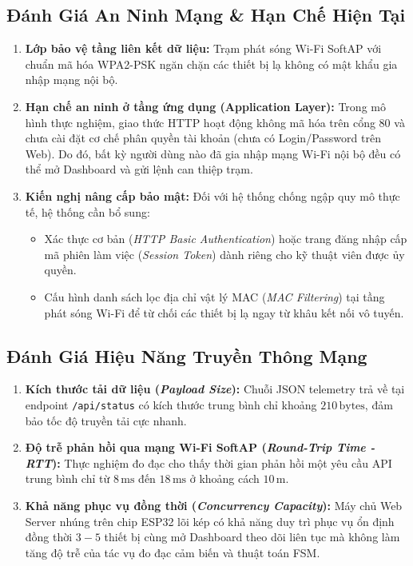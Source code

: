 \subsection{Đánh Giá An Ninh Mạng \& Hạn Chế Hiện Tại}
\begin{enumerate}
    \item \textbf{Lớp bảo vệ tầng liên kết dữ liệu:} Trạm phát sóng Wi-Fi SoftAP với chuẩn mã hóa WPA2-PSK ngăn chặn các thiết bị lạ không có mật khẩu gia nhập mạng nội bộ.
    \item \textbf{Hạn chế an ninh ở tầng ứng dụng (Application Layer):} Trong mô hình thực nghiệm, giao thức HTTP hoạt động không mã hóa trên cổng 80 và chưa cài đặt cơ chế phân quyền tài khoản (chưa có Login/Password trên Web). Do đó, bất kỳ người dùng nào đã gia nhập mạng Wi-Fi nội bộ đều có thể mở Dashboard và gửi lệnh can thiệp trạm.
    \item \textbf{Kiến nghị nâng cấp bảo mật:} Đối với hệ thống chống ngập quy mô thực tế, hệ thống cần bổ sung:
    \begin{itemize}
        \item Xác thực cơ bản (\textit{HTTP Basic Authentication}) hoặc trang đăng nhập cấp mã phiên làm việc (\textit{Session Token}) dành riêng cho kỹ thuật viên được ủy quyền.
        \item Cấu hình danh sách lọc địa chỉ vật lý MAC (\textit{MAC Filtering}) tại tầng phát sóng Wi-Fi để từ chối các thiết bị lạ ngay từ khâu kết nối vô tuyến.
    \end{itemize}
\end{enumerate}

\subsection{Đánh Giá Hiệu Năng Truyền Thông Mạng}
\label{sec:network_performance}
\begin{enumerate}
    \item \textbf{Kích thước tải dữ liệu (\textit{Payload Size}):} Chuỗi JSON telemetry trả về tại endpoint \texttt{/api/status} có kích thước trung bình chỉ khoảng $210\,\text{bytes}$, đảm bảo tốc độ truyền tải cực nhanh.
    \item \textbf{Độ trễ phản hồi qua mạng Wi-Fi SoftAP (\textit{Round-Trip Time - RTT}):} Thực nghiệm đo đạc cho thấy thời gian phản hồi một yêu cầu API trung bình chỉ từ $8\,\text{ms}$ đến $18\,\text{ms}$ ở khoảng cách $10\,\text{m}$.
    \item \textbf{Khả năng phục vụ đồng thời (\textit{Concurrency Capacity}):} Máy chủ Web Server nhúng trên chip ESP32 lõi kép có khả năng duy trì phục vụ ổn định đồng thời $3 - 5$ thiết bị cùng mở Dashboard theo dõi liên tục mà không làm tăng độ trễ của tác vụ đo đạc cảm biến và thuật toán FSM.
\end{enumerate}
